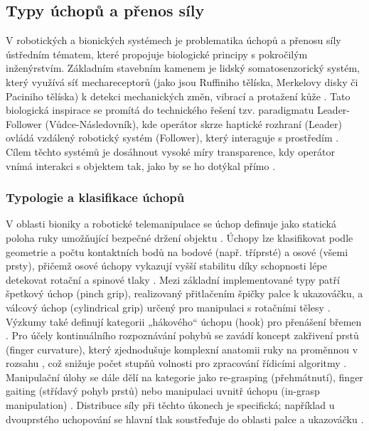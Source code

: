 \subsection{Typy úchopů a přenos síly}

V robotických a bionických systémech je problematika úchopů a přenosu síly ústředním tématem, které propojuje biologické principy s pokročilým inženýrstvím. Základním stavebním kamenem je lidský somatosenzorický systém, který využívá síť mechareceptorů (jako jsou Ruffiniho tělíska, Merkelovy disky či Paciniho tělíska) k detekci mechanických změn, vibrací a protažení kůže \cite{Cihak2016}. Tato biologická inspirace se promítá do technického řešení tzv. paradigmatu Leader-Follower (Vůdce-Následovník), kde operátor skrze haptické rozhraní (Leader) ovládá vzdálený robotický systém (Follower), který interaguje s prostředím \cite{GIUDICI2025}. Cílem těchto systémů je dosáhnout vysoké míry transparence, kdy operátor vnímá interakci s objektem tak, jako by se ho dotýkal přímo \cite{GIUDICI2025}.
\subsubsection{Typologie a klasifikace úchopů}
V oblasti bioniky a robotické telemanipulace se úchop definuje jako statická poloha ruky umožňující bezpečné držení objektu \cite{Nyrobtseva2018}. Úchopy lze klasifikovat podle geometrie a počtu kontaktních bodů na bodové (např. tříprsté) a osové (všemi prsty), přičemž osové úchopy vykazují vyšší stabilitu díky schopnosti lépe detekovat rotační a spinové tlaky \cite{Trajlinek2021}. Mezi základní implementované typy patří špetkový úchop (pinch grip), realizovaný přitlačením špičky palce k ukazováčku, a válcový úchop (cylindrical grip) určený pro manipulaci s rotačními tělesy \cite{Nyrobtseva2018}. Výzkumy také definují kategorii „hákového“ úchopu (hook) pro přenášení břemen \cite{Nyrobtseva2018, GIUDICI2025}.
Pro účely kontinuálního rozpoznávání pohybů se zavádí koncept zakřivení prstů (finger curvature), který zjednodušuje komplexní anatomii ruky na proměnnou v rozsahu \cite{GIUDICI2025}, což snižuje počet stupňů volnosti pro zpracování řídicími algoritmy \cite{Sun2023}. Manipulační úlohy se dále dělí na kategorie jako re-grasping (přehmátnutí), finger gaiting (střídavý pohyb prstů) nebo manipulaci uvnitř úchopu (in-grasp manipulation) \cite{GIUDICI2025}. Distribuce síly při těchto úkonech je specifická; například u dvouprstého uchopování se hlavní tlak soustřeďuje do oblasti palce a ukazováčku \cite{Nyrobtseva2018}.
